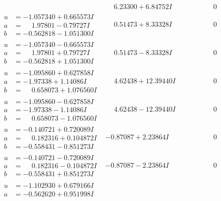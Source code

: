 \documentclass[1p]{elsarticle_modified}
\theoremstyle{definition}
\begin{document}
$$\begin{array}{c|c|c}
 & \phantom{-}6.23300 + 6.84752 I & \phantom{-0.000000 } 0 \\ \hline\begin{aligned}
u &= -1.057340 + 0.665573 I \\
a &= \phantom{-}1.97801 - 0.79727 I \\
b &= -0.562818 - 1.051300 I\end{aligned}
 & \phantom{-}0.51473 + 8.33328 I & \phantom{-0.000000 } 0 \\ \hline\begin{aligned}
u &= -1.057340 - 0.665573 I \\
a &= \phantom{-}1.97801 + 0.79727 I \\
b &= -0.562818 + 1.051300 I\end{aligned}
 & \phantom{-}0.51473 - 8.33328 I & \phantom{-0.000000 } 0 \\ \hline\begin{aligned}
u &= -1.095860 + 0.627858 I \\
a &= -1.97338 + 1.14086 I \\
b &= \phantom{-}0.658073 + 1.076560 I\end{aligned}
 & \phantom{-}4.62438 + 12.39440 I & \phantom{-0.000000 } 0 \\ \hline\begin{aligned}
u &= -1.095860 - 0.627858 I \\
a &= -1.97338 - 1.14086 I \\
b &= \phantom{-}0.658073 - 1.076560 I\end{aligned}
 & \phantom{-}4.62438 - 12.39440 I & \phantom{-0.000000 } 0 \\ \hline\begin{aligned}
u &= -0.140721 + 0.720089 I \\
a &= \phantom{-}0.182316 + 0.104872 I \\
b &= -0.558431 - 0.851273 I\end{aligned}
 & -0.87087 + 2.23864 I & \phantom{-0.000000 } 0 \\ \hline\begin{aligned}
u &= -0.140721 - 0.720089 I \\
a &= \phantom{-}0.182316 - 0.104872 I \\
b &= -0.558431 + 0.851273 I\end{aligned}
 & -0.87087 - 2.23864 I & \phantom{-0.000000 } 0 \\ \hline\begin{aligned}
u &= -1.102930 + 0.679166 I \\
a &= -0.562620 + 0.951998 I \\

\end{aligned}
\end{array}$$
\end{document}
